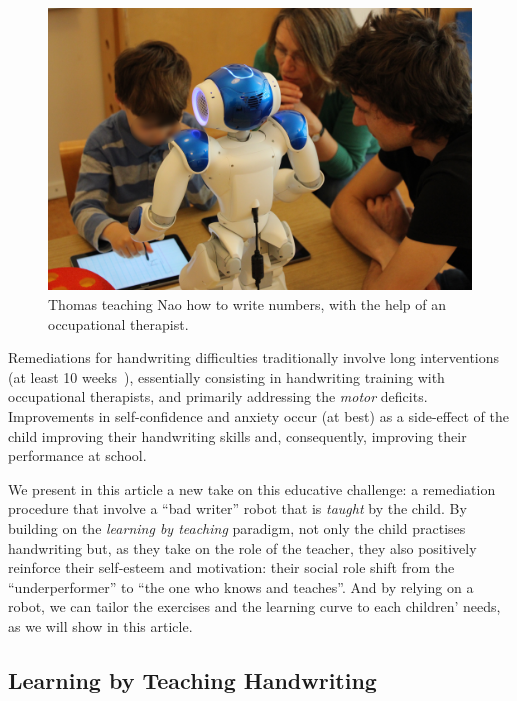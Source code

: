 \documentclass{article}
\begin{document}
\begin{figure}
    \centering
    \includegraphics[width=0.9\linewidth]{henry}
    \caption{\small Thomas teaching Nao how to write numbers, with the help of an
    occupational therapist.}
    \label{fig:henry}
\end{figure}

Remediations for handwriting difficulties traditionally involve long
interventions (at least 10 weeks~\cite{Hoy2011}), essentially consisting in
handwriting training with occupational therapists, and primarily addressing the
\emph{motor} deficits.  Improvements in self-confidence and anxiety occur (at
best) as a side-effect of the child improving their handwriting skills and,
consequently, improving their performance at school.

We present in this article a new take on this educative challenge: a remediation
procedure that involve a ``bad writer'' robot that is \emph{taught} by the
child. By building on the \emph{learning by teaching} paradigm, not only the
child practises handwriting but, as they take on the role of the teacher, they
also positively reinforce their self-esteem and motivation: their social role
shift from the ``underperformer'' to ``the one who knows and teaches''. And by
relying on a robot, we can tailor the exercises and the learning curve to each
children' needs, as we will show in this article.

\subsection{Learning by Teaching Handwriting}
\end{document}

